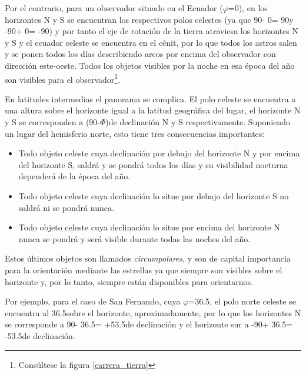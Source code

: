 \documentclass[11pt,a5paper,twoside]{amsbook}
\begin{document}
Por el contrario, para un observador situado en el Ecuador ($\varphi$=0\textdegree), en los horizontes N y S se encuentran los respectivos polos celestes (ya que 90\textdegree - 0\textdegree = 90\textdegree y -90\textdegree + 0\textdegree = -90\textdegree) y por tanto el eje de rotación de la tierra atraviesa los horizontes N y S y el ecuador celeste se encuentra en el cénit, por lo que todos los astros salen y se ponen todos los días describiendo arcos por encima del observador con dirección este-oeste. Todos los objetos visibles por la noche en esa época del año son visibles para el observador\footnote{Consúltese la figura \ref{carrera_tierra}}.

En latitudes intermedias el panorama se complica. El polo celeste se encuentra a una altura sobre el horizonte igual a la latitud geográfica del lugar, el horizonte N y S se corresponden a (90-$\Phi$)\textdegree de declinación N y S respectivamente. Suponiendo un lugar del hemisferio norte, esto tiene tres consecuencias importantes:

\begin{itemize}
 \item Todo objeto celeste cuya declinación por debajo del horizonte N y por encima del horizonte S, saldrá y se pondrá todos los días y su visibilidad nocturna dependerá de la época del año.
 \item Todo objeto celeste cuya declinación lo situe por debajo del horizonte S no saldrá ni se pondrá nunca.
 \item Todo objeto celeste cuya declinación lo situe por encima del horizonte N nunca se pondrá y será visible durante todas las noches del año.
\end{itemize}

Estos últimos objetos son llamados \textit{circumpolares}, y son de capital importancia para la orientación mediante las estrellas ya que siempre son visibles sobre el horizonte y, por lo tanto, siempre están disponibles para orientarnos.

Por ejemplo, para el caso de San Fernando, cuya $\varphi$=36.5\textdegree, el polo norte celeste se encuentra al 36.5\textdegree sobre el horizonte, aproximadamente, por lo que los horizontes N se corresponde a  90\textdegree - 36.5\textdegree = +53.5\textdegree de declinación y el horizonte sur a -90\textdegree + 36.5\textdegree = -53.5\textdegree de declinación.
\end{document}
